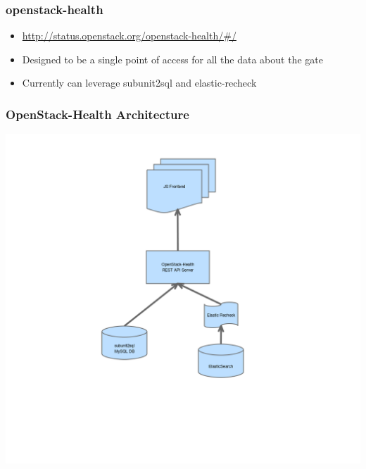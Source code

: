 \documentclass[aspectratio=169,11pt,hyperref={colorlinks=true}]{beamer}
\begin{document}
\begin{frame}
    \frametitle{openstack-health}
    \begin{itemize}
        \item \href{http://status.openstack.org/openstack-health/\#/}{http://status.openstack.org/openstack-health/\#/}
        \item Designed to be a single point of access for all the data about the gate
        \item Currently can leverage subunit2sql and elastic-recheck
    \end{itemize}
\end{frame}

\begin{frame}
    \frametitle{OpenStack-Health Architecture}
    \begin{center}
        \includegraphics[height=1.2\textheight]{openstack-health-arch.png}
    \end{center}
\end{frame}
\end{document}
